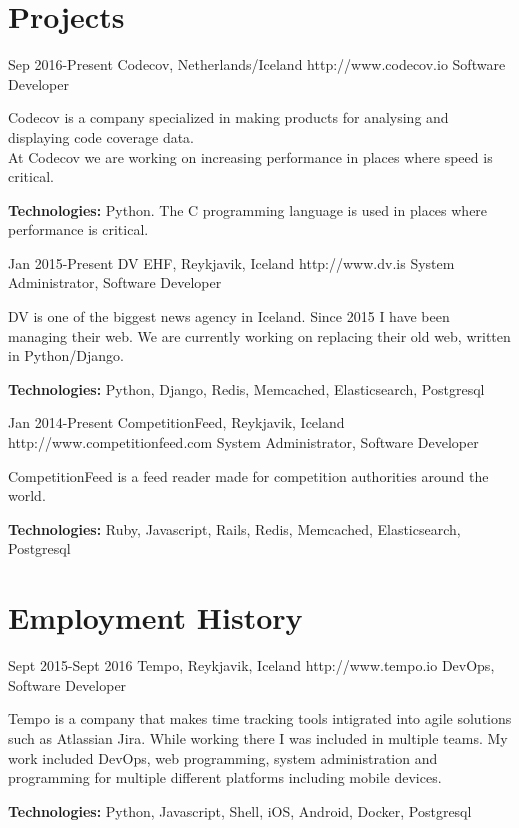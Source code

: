 \documentclass[10pt]{article} %
\begin{document}
\section{Projects}

\job
{Sep 2016-}{Present}
{Codecov, Netherlands/Iceland}
{http://www.codecov.io}
{Software Developer}
{Codecov is a company specialized in making products for analysing and displaying code coverage data.\\
At Codecov we are working on increasing performance in places where speed is critical.\\
\rule{0mm}{5mm}\textbf{Technologies:} Python. The C programming language is used in places where performance is critical.}


\job
{Jan 2015-}{Present}
{DV EHF, Reykjavik, Iceland}
{http://www.dv.is}
{System Administrator, Software Developer}
{DV is one of the biggest news agency in Iceland. Since 2015 I have been managing their web. We are currently working on replacing their old web, written in Python/Django.\\
\rule{0mm}{5mm}\textbf{Technologies:} Python, Django, Redis, Memcached, Elasticsearch, Postgresql}


\job
{Jan 2014-}{Present}
{CompetitionFeed, Reykjavik, Iceland}
{http://www.competitionfeed.com}
{System Administrator, Software Developer}
{CompetitionFeed is a feed reader made for competition authorities around the world. \\
\rule{0mm}{5mm}\textbf{Technologies:} Ruby, Javascript, Rails, Redis, Memcached, Elasticsearch, Postgresql}


\section{Employment History}

\job
{Sept 2015-}{Sept 2016}
{Tempo, Reykjavik, Iceland}
{http://www.tempo.io}
{DevOps, Software Developer}
{Tempo is a company that makes time tracking tools intigrated into agile solutions such as Atlassian Jira.
While working there I was included in multiple teams. My work included DevOps, web programming, system administration and programming for multiple different platforms including mobile devices.\\
\rule{0mm}{5mm}\textbf{Technologies:} Python, Javascript, Shell, iOS, Android, Docker, Postgresql}
\end{document}
